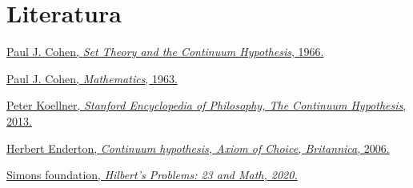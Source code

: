 \documentclass[12pt]{report}
\begin{document}
\section{Literatura}

\href{https://books.google.hr/books?hl=hr&lr=&id=Z4NCAwAAQBAJ&oi=fnd&pg=PP1&dq=the+continuum+hypothesis&ots=mOCipFbUby&sig=aADZAgZJi-_vNOQk6u2WaxqZHCw&redir_esc=y#v=onepage&q=the%20continuum%20hypothesis&f=false}{Paul J. Cohen, \emph{Set Theory and the Continuum Hypothesis}, 1966.}

\href{https://www.pnas.org/doi/epdf/10.1073/pnas.50.6.1143}{Paul J. Cohen, \emph{Mathematics}, 1963.}

\href{https://plato.stanford.edu/entries/continuum-hypothesis/?fbclid=IwAR0WxsujexRFoO9fqX2AoosC_mZzYmqzp5T54hexrVuUJxt_O_onGYMNKcI}{Peter Koellner, \emph{Stanford Encyclopedia of Philosophy, The Continuum Hypothesis}, 2013.}

\href{https://www.britannica.com/biography/Georg-Ferdinand-Ludwig-Philipp-Cantor}{Herbert Enderton, \emph{Continuum hypothesis, Axiom of Choice, Britannica}, 2006.}

\href{https://www.simonsfoundation.org/2020/05/06/hilberts-problems-23-and-math/}{Simons foundation, \emph{Hilbert's Problems: 23 and Math, 2020.}}
\end{document}
